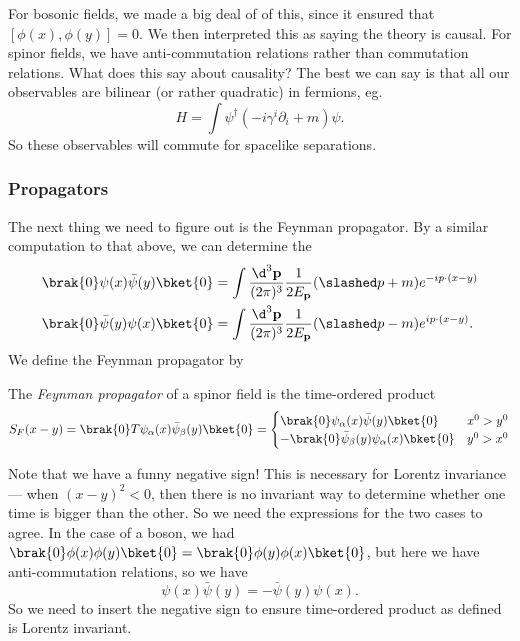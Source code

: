 \documentclass[a4paper]{article}
\begin{document}
For bosonic fields, we made a big deal of of this, since it ensured that $[\phi(x), \phi(y)] = 0$. We then interpreted this as saying the theory is causal. For spinor fields, we have anti-commutation relations rather than commutation relations. What does this say about causality? The best we can say is that all our observables are bilinear (or rather quadratic) in fermions, eg.
\[
  H = \int \psi^\dagger (-i \gamma^i \partial_i + m) \psi.
\]
So these observables will commute for spacelike separations.


\subsubsection*{Propagators}
The next thing we need to figure out is the Feynman propagator. By a similar computation to that above, we can determine the 
\begin{align*}
  \brak{0} \psi(x) \bar\psi(y)\bket{0} &= \int \frac{\d^3 \mathbf{p}}{(2\pi)^3} \frac{1}{2E_\mathbf{p}}(\slashed p + m) e^{-ip\cdot (x - y)}\\
  \brak{0} \bar\psi(y) \psi(x)\bket{0} &= \int \frac{\d^3 \mathbf{p}}{(2\pi)^3} \frac{1}{2E_\mathbf{p}}(\slashed p - m) e^{ip\cdot (x - y)}.
\end{align*}
We define the Feynman propagator by
\begin{defi}
  The \emph{Feynman propagator} of a spinor field is the time-ordered product
  \[
    S_F(x - y) = \brak{0} T \psi_\alpha(x) \bar\psi_\beta(y)\bket{0} =
    \begin{cases}
      \brak{0}\psi_\alpha(x) \bar\psi(y)\bket{0} & x^0 > y^0\\
      -\brak{0} \bar\psi_\beta(y) \psi_\alpha(x) \bket{0} & y^0 > x^0
    \end{cases}
  \]
\end{defi}
Note that we have a funny negative sign! This is necessary for Lorentz invariance --- when $(x - y)^2 < 0$, then there is no invariant way to determine whether one time is bigger than the other. So we need the expressions for the two cases to agree. In the case of a boson, we had $\brak{0}\phi(x) \phi(y) \bket{0} = \brak{0} \phi(y) \phi(x)\bket{0}$, but here we have anti-commutation relations, so we have
\[
  \psi(x) \bar\psi(y) = - \bar\psi (y) \psi(x).
\]
So we need to insert the negative sign to ensure time-ordered product as defined is Lorentz invariant.
\end{document}
